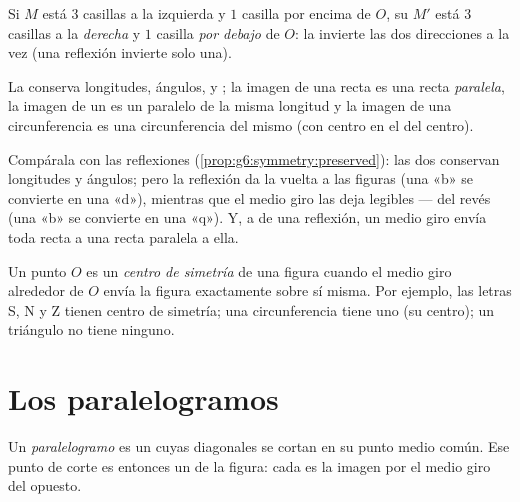 \begin{example}[En la cuadrícula]\label{ex:g7:central:grid}
Si $M$ está $3$ casillas a la izquierda y $1$ casilla por encima de $O$, su 
$M'$ está $3$ casillas a la \emph{derecha} y $1$ casilla \emph{por debajo} de $O$:
la  invierte las dos direcciones a la vez (una reflexión
invierte solo una).
\end{example}

\begin{proposition}\label{prop:g7:central:preserved}
La  conserva longitudes, ángulos,  y ; la
imagen de una recta es una recta \emph{paralela}, la imagen de un  es un
 paralelo de la misma longitud y la imagen de una circunferencia es una circunferencia
del mismo  (con centro en el  del centro).
\end{proposition}
\admitted

\begin{remark}
Compárala con las reflexiones (\cref{prop:g6:symmetry:preserved}): las dos
conservan longitudes y ángulos; pero la reflexión da la vuelta a las figuras
(una «b» se convierte en una «d»), mientras que el medio giro las deja legibles ---
del revés (una «b» se convierte en una «q»). Y, a  de una reflexión, un
medio giro envía toda recta a una recta paralela a ella.
\end{remark}

\begin{definition}\label{def:g7:central:center}
Un punto $O$ es un \emph{centro de simetría}
de una figura cuando el medio giro alrededor de $O$ envía la figura exactamente
sobre sí misma. Por ejemplo, las letras S, N y Z tienen centro de
simetría; una circunferencia tiene uno (su centro); un triángulo no tiene ninguno.
\end{definition}

\section{Los paralelogramos}

\begin{definition}[Paralelogramo]\label{def:g7:central:parallelogram}
Un \emph{paralelogramo} es un  cuyas
diagonales se cortan en su punto medio común. Ese punto de corte es entonces
un  de la figura: cada  es la imagen por el medio giro
del  opuesto.
\end{definition}

